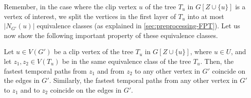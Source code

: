 \documentclass[a4paper,UKenglish,cleveref, autoref, thm-restate]{lipics-v2021}
\begin{document}
Remember, in the case where the clip vertex $u$ of the tree $T_u$ in $G[Z \cup \{u\}]$ is a vertex of interest, we split the vertices in the first layer of $T_u$ into at most $|N_{G'}(u)|$ equivalence classes (as explained in \cref{sec:preprocessing-FPT}).
Let us now show the following important property of these equivalence classes.
\begin{lemma}\label{lemma:treeEquivClass-intVertices}
    Let $u \in V(G')$ be a clip vertex of the tree $T_u$ in $G[Z \cup \{u\}]$, where $u \in U$,
    and let $z_1,z_2 \in V(T_u)$ be in the same equivalence class of the tree $T_u$.
    Then, the fastest temporal paths from $z_1$ and from $z_2$ to any other vertex in $G'$ coincide on the edges in $G'$.
    Similarly, the fastest temporal paths from any other vertex in $G'$ to $z_1$ and to $z_2$ coincide on the edges in $G'$.
\end{lemma}
%
\end{document}
